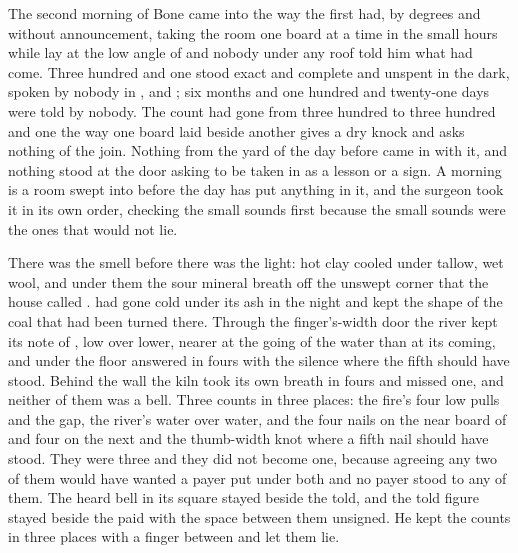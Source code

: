 
The second morning of Bone came into  the way the first had, by degrees and without announcement, taking the room one board at a time in the small hours while  lay at the low angle of  and nobody under any roof told him what had come. Three hundred and one stood exact and complete and unspent in the dark, spoken by nobody in ,  and ; six months and one hundred and twenty-one days were told by nobody. The count had gone from three hundred to three hundred and one the way one board laid beside another gives a dry knock and asks nothing of the join. Nothing from the yard of the day before came in with it, and nothing stood at the door asking to be taken in as a lesson or a sign. A morning is a room swept into before the day has put anything in it, and the surgeon took it in its own order, checking the small sounds first because the small sounds were the ones that would not lie.

There was the smell before there was the light: hot clay cooled under tallow, wet wool, and under them the sour mineral breath off the unswept corner that the house called .  had gone cold under its ash in the night and kept the shape of the coal that had been turned there. Through the finger's-width door the river kept its note of , low over lower, nearer at the going of the water than at its coming, and under the floor  answered in fours with the silence where the fifth should have stood. Behind the wall the kiln took its own breath in fours and missed one, and neither of them was a bell. Three counts in three places: the fire's four low pulls and the gap, the river's water over water, and the four nails on the near board of  and four on the next and the thumb-width knot where a fifth nail should have stood. They were three and they did not become one, because agreeing any two of them would have wanted a payer put under both and no payer stood to any of them. The heard bell in its square stayed beside the told, and the told figure stayed beside the paid with the space between them unsigned. He kept the counts in three places with a finger between and let them lie.

